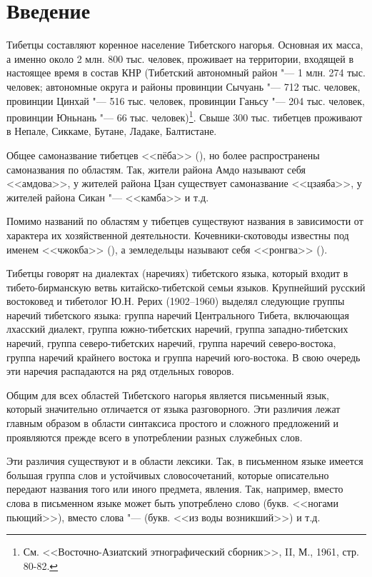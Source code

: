 \chapter{Введение}

Тибетцы составляют коренное население Тибетского нагорья. Основная их масса, а именно около 2 млн. 800 тыс. человек, проживает на территории, входящей в настоящее время в состав КНР (Тибетский автономный район "--- 1 млн. 274 тыс. человек; автономные округа и районы провинции Сычуань "--- 712 тыс. человек, провинции Цинхай "--- 516 тыс. человек, провинции Ганьсу "--- 204 тыс. человек, провинции Юньнань "--- 66 тыс. человек)\footnote[1]{См. <<Восточно-Азиатский этнографический сборник>>, II, М., 1961, стр. 80-82.}. Свыше 300 тыс. тибетцев проживают в Непале, Сиккаме, Бутане, Ладаке, Балтистане.

Общее самоназвание тибетцев <<пёба>> (), но более распространены самоназвания по областям. Так, жители района Амдо называют себя <<амдова>>, у жителей района Цзан существует самоназвание <<цзаяба>>, у жителей района Сикан "--- <<камба>> и т.д.

Помимо названий по областям у тибетцев существуют названия в зависимости от характера их хозяйственной деятельности. Кочевники-скотоводы известны под именем <<чжокба>> (), а земледельцы называют себя <<ронгва>> ().

Тибетцы говорят на диалектах (наречиях) тибетского языка, который входит в тибето-бирманскую ветвь китайско-тибетской семьи языков. Крупнейший русский востоковед и тибетолог Ю.Н. Рерих (1902--1960) выделял следующие группы наречий тибетского языка: группа наречий Центрального Тибета, включающая лхасский диалект, группа южно-тибетских наречий, группа западно-тибетских наречий, группа северо-тибетских наречий, группа наречий северо-востока, группа наречий крайнего востока и группа наречий юго-востока. В свою очередь эти наречия распадаются на ряд отдельных говоров.

Общим для всех областей Тибетского нагорья является письменный язык, который значительно отличается от языка разговорного. Эти различия лежат главным образом в области синтаксиса простого и сложного предложений и проявляются прежде всего в употреблении разных служебных слов.

Эти различия существуют и в области лексики. Так, в письменном языке имеется большая группа слов и устойчивых словосочетаний, которые описательно передают названия того или иного предмета, явления. Так, например, вместо слова  в письменном языке может быть употреблено слово  (букв. <<ногами пьющий>>), вместо слова   "---  (букв. <<из воды возникший>>) и т.д.

